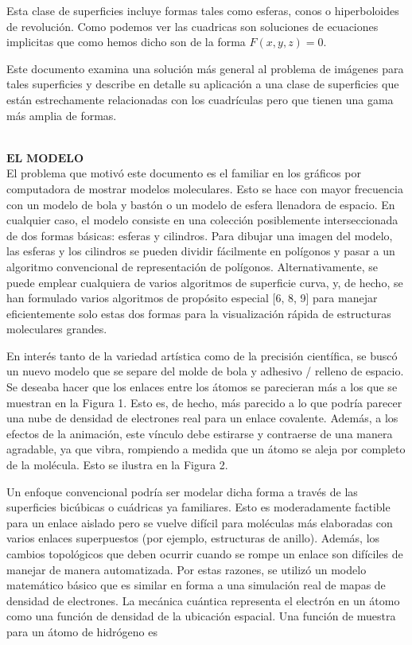 Esta clase de superficies incluye formas tales como esferas, conos o hiperboloides de revolución. Como podemos ver las cuadricas son soluciones de ecuaciones implicitas que como hemos dicho son de la forma $F(x, y, z) = 0$.

Este documento examina una solución más general al problema de imágenes para tales superficies y describe en detalle su aplicación a una clase de superficies que están estrechamente relacionadas con los cuadrículas pero que tienen una gama más amplia de formas.


${ }$\\
$\textbf{EL MODELO}$
${ }$\\

El problema que motivó este documento es el familiar en los gráficos por computadora de mostrar modelos moleculares. Esto se hace con mayor frecuencia con un modelo de bola y bastón o un modelo de esfera llenadora de espacio. En cualquier caso, el modelo consiste en una colección posiblemente interseccionada de dos formas básicas: esferas y cilindros. Para dibujar una imagen del modelo, las esferas y los cilindros se pueden dividir fácilmente en polígonos y pasar a un algoritmo convencional de representación de polígonos. Alternativamente, se puede emplear cualquiera de varios algoritmos de superficie curva, y, de hecho, se han formulado varios algoritmos de propósito especial [6, 8, 9] para manejar eficientemente solo estas dos formas para la visualización rápida de estructuras moleculares grandes.

En interés tanto de la variedad artística como de la precisión científica, se buscó un nuevo modelo que se separe del molde de bola y adhesivo / relleno de espacio. Se deseaba hacer que los enlaces entre los átomos se parecieran más a los que se muestran en la Figura 1. Esto es, de hecho, más parecido a lo que podría parecer una nube de densidad de electrones real para un enlace covalente. Además, a los efectos de la animación, este vínculo debe estirarse y contraerse de una manera agradable, ya que vibra, rompiendo a medida que un átomo se aleja por completo de la molécula. Esto se ilustra en la Figura 2.

Un enfoque convencional podría ser modelar dicha forma a través de las superficies bicúbicas o cuádricas ya familiares. Esto es moderadamente factible para un enlace aislado pero se vuelve difícil para moléculas más elaboradas con varios enlaces superpuestos (por ejemplo, estructuras de anillo). Además, los cambios topológicos que deben ocurrir cuando se rompe un enlace son difíciles de manejar de manera automatizada. Por estas razones, se utilizó un modelo matemático básico que es similar en forma a una simulación real de mapas de densidad de electrones. La mecánica cuántica representa el electrón en un átomo como una función de densidad de la ubicación espacial. Una función de muestra para un átomo de hidrógeno es

